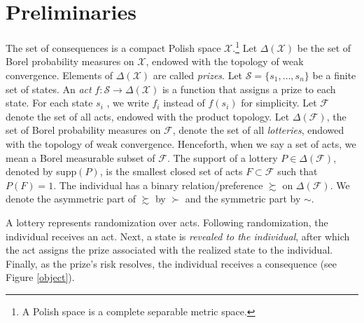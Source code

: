 \documentclass[12pt, notitlepage]{article}
\begin{document}
\section{Preliminaries}

\label{mainsection}The set of consequences is a compact Polish space $%
\mathcal{X}$.\footnote{%
A Polish space is a complete separable metric space.} Let $\Delta (\mathcal{X%
})$ be the set of Borel probability measures on $\mathcal{X}$, endowed with
the topology of weak convergence. Elements of $\Delta (\mathcal{X})$ are
called \textit{prizes}. Let $\mathcal{S}=\{s_{1},\dots ,s_{n}\}$ be a finite
set of states. An \textit{act} $f:\mathcal{S}\rightarrow \Delta (\mathcal{X}%
) $ is a function that assigns a prize to each state. For each state $s_{i}$%
, we write $f_{i}$ instead of $f(s_{i})$ for simplicity. Let $\mathcal{F}$
denote the set of all acts, endowed with the product topology. Let $\Delta (%
\mathcal{F})$, the set of Borel probability measures on $\mathcal{F}$,
denote the set of all \textit{lotteries}, endowed with the topology of weak
convergence. Henceforth, when we say a set of acts, we mean a Borel
measurable subset of $\mathcal{F}$. The support of a lottery $P\in \Delta (%
\mathcal{F})$, denoted by supp$(P)$, is the smallest closed set of acts $%
F\subset \mathcal{F}$ such that $P(F)=1$. The individual has a binary
relation/preference $\succsim $ on $\Delta (\mathcal{F})$. We denote the
asymmetric part of $\succsim $ by $\succ $ and the symmetric part by $\sim $.

A lottery represents randomization over acts. Following randomization, the
individual receives an act. Next, a state is \textit{revealed to the
individual}, after which the act assigns the prize associated with the
realized state to the individual. Finally, as the prize's risk resolves, the
individual receives a consequence (see Figure \ref{object}).

\end{document}
